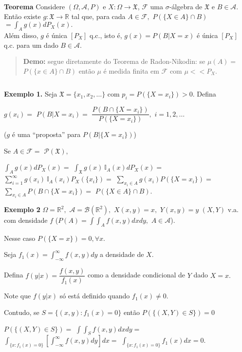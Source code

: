 \documentclass[
]{book}
\begin{document}
\(~\)

\(~\)

\textbf{Teorema} Considere \((\Omega,\mathcal{A},P)\) e \(X:\Omega \longrightarrow \mathfrak{X}\), \(\mathcal{F}\) uma \(\sigma\)-álgebra de \(\mathfrak{X}\) e \(B \in \mathcal{A}.\) Então existe \(g:\mathfrak{X} \longrightarrow \mathbb{R}\) tal que, para cada \(A \in \mathcal{F},\)
\(P(\{X\in A\}\cap B)\) \(=\displaystyle\int_Ag(x)dP_X(x).\)\\
Além disso, \(g\) é única \([P_X]\) q.c., isto é, \(g(x)=P(B|X=x)\) é única \([P_X]\) q.c. para um dado \(B\in\mathcal{A}\).

\begin{quote}
\textbf{Demo:} segue diretamente do Teorema de Radon-Nikodin: se \(\mu(A)=\) \(P(\{x\in A\}\cap B)\) então \(\mu\) é medida finita em \(\mathcal{F}\) com \(\mu << P_X\).
\end{quote}

\(~\)

\textbf{Exemplo 1.} Seja \(\mathfrak{X}=\{x_1,x_2,\ldots\}\) com \(p_i=P(\{X=x_i\})>0.\) Defina

\(g(x_i)=\) \(P(B|X=x_i)=\) \(\dfrac{P(B\cap \{X=x_i\})}{P(\{X=x_i\})},\) \(i=1,2,\ldots\)

(\(g\) é uma ``proposta'' para \(P(B|\{X=x_i\})\))

Se \(A \in \mathcal{F}=\) \(\mathcal{P}(\mathfrak{X}),\)

\(\int_A g(x)dP_X(x)=\) \(\int_{\mathfrak{X}}g(x)~\mathbb{I}_A(x)dP_X(x)=\) \(\sum_{i=1}^\infty g(x_i)~\mathbb{I}_A(x_i)P_X(\{x_i\})=\) \(\sum_{x_i \in A}g(x_i)P(\{X=x_i\})=\) \(\sum_{x_i \in A}P(B \cap \{X=x_i\})=\) \(P(\{X\in A\}\cap B).\)

\textbf{Exemplo 2} \(\Omega=\mathbb{R}^2,\) \(\mathcal{A}= \mathcal{B}(\mathbb{R}^2),\) \(X(x,y)=x,\) \(Y(x,y)=y\) \((X,Y)\) v.a. com densidade \(f\) (\(P(A)=\int \int_A f(x,y)dxdy,\) \(A \in \mathcal{A}\)).

Nesse caso \(P(\{X=x\})=0, \forall x.\)

Seja \(f_1(x)=\int_{-\infty}^{\infty} f(x,y)dy\) a densidade de \(X\).

Defina \(f(y|x)=\dfrac{f(x,y)}{f_1(x)}\) como a densidade condicional de \(Y\) dado \(X=x.\)

Note que \(f(y|x)\) só está definido quando \(f_1(x) \neq 0.\)

Contudo, se \(S=\{(x,y): f_1(x)=0\}\) então \(P(\{(X,Y)\in S\})=0\)

\(P(\{(X,Y)\in S\})=\) \(\int \int_S f(x,y)dxdy=\) \(\int_{\{x:f_1(x)=0\}}\left[\int_{-\infty}^\infty f(x,y)dy\right]dx=\) \(\int_{\{x:f_1(x)=0\}} f_1(x)dx=0.\)
\end{document}
